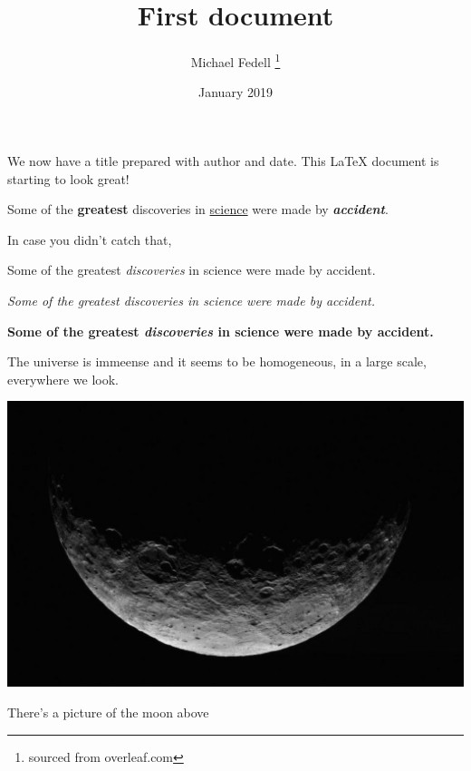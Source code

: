 \documentclass[12pt, letterpaper]{article}
\title{First document}
\author{Michael Fedell \thanks{sourced from overleaf.com}}
\date{January 2019}
\begin{document}
\maketitle
We now have a title prepared with author and date.
This \LaTeX{} document is starting to look great!

Some of the \textbf{greatest}
discoveries in \underline{science}
were made by \textbf{\textit{accident}}.


In case you didn't catch that,

Some of the greatest \emph{discoveries}
in science
were made by accident.

\textit{Some of the greatest \emph{discoveries}
in science
were made by accident.}

\textbf{Some of the greatest \emph{discoveries}
in science
were made by accident.}


The universe is immeense and it seems to be homogeneous, in a large scale, everywhere we look.

\includegraphics{moon}

There's a picture of the moon above
\end{document}
